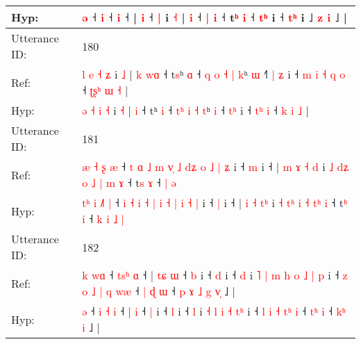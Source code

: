 \documentclass[10pt]{article}
\DeclareRobustCommand{\hl}[1]{{\textcolor{red}{#1}}}
\begin{document}
\begin{longtable}{ll}
 \\
Hyp: & \hl{}\hl{}\hl{}\hl{}\hl{}\hl{}\hl{}\hl{}\hl{}\hl{}\hl{}\hl{ə} ˧\hl{}\hl{}\hl{}\hl{}\hl{}\hl{} \hl{i} ˧\hl{}\hl{} \hl{i} ˧ |\hl{}\hl{} \hl{i} ˧ \hl{|} i \hl{˧} |\hl{}\hl{}\hl{}\hl{} \hl{i} ˧ \hl{|} \hl{i} ˧\hl{}\hl{} t\hl{ʰ} \hl{i} ˧ \hl{}\hl{t}\hl{ʰ} i\hl{} ˧\hl{}\hl{}\hl{}\hl{} \hl{}\hl{t}\hl{ʰ} i\hl{} ˩ \hl{}\hl{}\hl{z} \hl{i} ˩ |
 \\
\midrule
Utterance ID: & 180 \\
Ref: & \hl{l} \hl{e} \hl{˧} \hl{ʑ} i \hl{˩} |\hl{ }\hl{k} \hl{w}\hl{ɑ} ˧ t\hl{s}ʰ \hl{ɑ} ˧ \hl{q}\hl{ }\hl{o} \hl{˧} \hl{|} \hl{k}ʰ \hl{ɯ} ˧\hl{˥} \hl{|}\hl{ }\hl{ʑ} i ˧\hl{ }\hl{m}\hl{ }\hl{i} \hl{˧}\hl{ }\hl{q} \hl{o} ˧ \hl{ʈ}\hl{ʂ}\hl{ʰ} \hl{ɯ} \hl{˧} |
 \\
Hyp: & \hl{ə} \hl{˧} \hl{i} \hl{˧} i \hl{˧} |\hl{}\hl{} \hl{}\hl{i} ˧ t\hl{}ʰ \hl{i} ˧ \hl{}\hl{t}\hl{ʰ} \hl{i} \hl{˧} \hl{t}ʰ \hl{i} ˧\hl{} \hl{}\hl{t}\hl{ʰ} i ˧\hl{}\hl{}\hl{}\hl{} \hl{}\hl{t}\hl{ʰ} \hl{i} ˧ \hl{}\hl{}\hl{k} \hl{i} \hl{˩} |
 \\
\midrule
Utterance ID: & 181 \\
Ref: & \hl{}\hl{æ} \hl{˧} \hl{}\hl{ʂ} \hl{æ} ˧ \hl{t} \hl{ɑ} \hl{˩} \hl{m} \hl{v}\hl{̩} \hl{˩} \hl{d}\hl{ʑ} \hl{o} \hl{˩} \hl{|} \hl{ʑ} i ˧ \hl{m} i ˧ | \hl{m} \hl{ɤ} \hl{˧}\hl{ }\hl{d} i \hl{˩} \hl{d}\hl{ʑ} \hl{o} \hl{˩} \hl{|}\hl{ }\hl{m} \hl{ɤ} ˧ t\hl{s} \hl{ɤ} ˧\hl{}\hl{}\hl{}\hl{} \hl{|} \hl{ə}
 \\
Hyp: & \hl{t}\hl{ʰ} \hl{i} \hl{˩}\hl{˥} \hl{|} ˧ \hl{i} \hl{˧} \hl{i} \hl{˧} \hl{}\hl{|} \hl{i} \hl{}\hl{˧} \hl{|} \hl{i} \hl{˧} \hl{|} i ˧ \hl{|} i ˧ | \hl{i} \hl{˧} \hl{}\hl{t}\hl{ʰ} i \hl{˧} \hl{t}\hl{ʰ} \hl{i} \hl{˧} \hl{}\hl{t}\hl{ʰ} \hl{i} ˧ t\hl{ʰ} \hl{i} ˧\hl{ }\hl{k}\hl{ }\hl{i} \hl{˩} \hl{|}
 \\
\midrule
Utterance ID: & 182 \\
Ref: & \hl{k}\hl{ }\hl{w}\hl{ɑ} ˧ \hl{t}\hl{s}\hl{ʰ} \hl{ɑ} ˧ |\hl{ }\hl{t}\hl{ɕ} \hl{ɯ} ˧ \hl{b} i ˧ \hl{d} i ˧ \hl{d} i\hl{ }\hl{˥}\hl{ }\hl{|} \hl{m} \hl{h} \hl{o} \hl{˩} \hl{|}\hl{ }\hl{p} i ˧ \hl{z} \hl{o} \hl{˩} \hl{|}\hl{ }\hl{q} \hl{w}\hl{æ} ˧ \hl{|}\hl{ }\hl{ɖ} \hl{ɯ} ˧\hl{ }\hl{p}\hl{ }\hl{ɤ} \hl{˩}\hl{ }\hl{g} \hl{v}\hl{̩} ˩ |
 \\
Hyp: & \hl{}\hl{}\hl{}\hl{ə} ˧ \hl{i}\hl{ }\hl{˧} \hl{i} ˧ |\hl{}\hl{}\hl{} \hl{i} ˧ \hl{|} i ˧ \hl{l} i ˧ \hl{l} i\hl{}\hl{}\hl{}\hl{} \hl{˧} \hl{l} \hl{i} \hl{˧} \hl{}\hl{t}\hl{ʰ} i ˧ \hl{l} \hl{i} \hl{˧} \hl{}\hl{t}\hl{ʰ} \hl{}\hl{i} ˧ \hl{}\hl{t}\hl{ʰ} \hl{i} ˧\hl{}\hl{}\hl{}\hl{} \hl{}\hl{k}\hl{ʰ} \hl{}\hl{i} ˩ |

\end{longtable}
\end{document}
